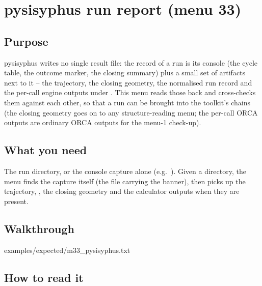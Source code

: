 \chapter{pysisyphus run report (menu 33)}
\label{ch:menu33}

\section{Purpose}

pysisyphus writes no single result file: the record of a run is its console
(the cycle table, the outcome marker, the closing summary) plus a small set of
artifacts next to it -- the trajectory, the closing geometry, the normalised
run record  and the per-call engine outputs under
.  This menu reads those back and cross-checks them against
each other, so that a run can be brought into the toolkit's chains (the
closing geometry goes on to any structure-reading menu; the per-call ORCA
outputs are ordinary ORCA outputs for the menu-1 check-up).

\section{What you need}

The run directory, or the console capture alone (e.g.\ ).  Given a directory, the menu finds the capture itself (the file
carrying the  banner), then picks up the trajectory,
, the closing geometry and the calculator outputs when they are
present.

\section{Walkthrough}


  {examples/expected/m33_pysisyphus.txt}

\section{How to read it}

